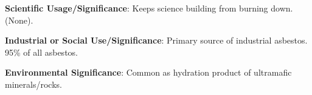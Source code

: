 \documentclass[10pt]{article}
\begin{document}
\begin{framed}
  \textbf{Scientific Usage/Significance}: Keeps science building from burning down. (None).
\end{framed}

\begin{framed}
  \textbf{Industrial or Social Use/Significance}: Primary source of industrial asbestos. 95\% of all asbestos.
\end{framed}

\begin{framed}
  \textbf{Environmental Significance}: Common as hydration product of ultramafic minerals/rocks.
\end{framed}

\end{document}
